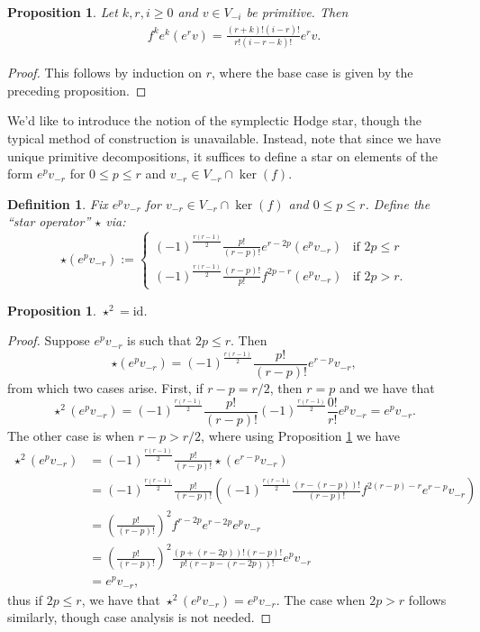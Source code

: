 \documentclass{amsart}
\newcommand{\id}{\text{id}}
\newtheorem{definition}[theorem]{Definition}
\newtheorem{prop}[theorem]{Proposition}
\theoremstyle{definition}
\begin{document}
\begin{prop}\label{e^kf^ke^rv_i}
    Let $k,r,i\geq 0$ and $v \in V_{-i}$ be primitive. Then
    \begin{align*}
        f^ke^k(e^rv) = \frac{(r+k)!(i-r)!}{r!(i-r-k)!} e^rv.
    \end{align*}
\end{prop}
\begin{proof}
    This follows by induction on $r$, where the base case is given by the preceding proposition.
\end{proof}
We'd like to introduce the notion of the symplectic Hodge star, though the typical method of construction is unavailable. Instead, note that since we have unique primitive decompositions, it suffices to define a star on elements of the form $e^pv_{-r}$ for $0 \leq p \leq r$ and $v_{-r}\in V_{-r}\cap \ker(f)$.
\begin{definition}
    Fix $e^pv_{-r}$ for $v_{-r} \in V_{-r}\cap \ker(f)$ and $0 \leq p \leq r$. Define the ``star operator'' $\star$ via:
    \begin{equation*}
        \star (e^pv_{-r}) := \begin{cases}
            (-1)^{\frac{r(r-1)}{2}} \frac{p!}{(r-p)!}e^{r-2p} (e^pv_{-r}) &\text{if }2p\leq r \\
            (-1)^{\frac{r(r-1)}{2}}\frac{(r-p)!}{p!} f^{2p-r}(e^pv_{-r}) &\text{if }2p>r.
        \end{cases}
    \end{equation*}
\end{definition}
\begin{prop}
    $\star^2=\id$.
\end{prop}
\begin{proof}
    Suppose $e^pv_{-r}$ is such that $2p \leq r$. Then
    \begin{equation*}
        \star(e^pv_{-r}) = (-1)^{\frac{r(r-1)}{2}} \frac{p!}{(r-p)!}e^{r-p}v_{-r},
    \end{equation*}
    from which two cases arise. First, if $r-p=r/2$, then $r=p$ and we have that
    \begin{equation*}
        \star^2(e^pv_{-r})=(-1)^{\frac{r(r-1)}{2}} \frac{p!}{(r-p)!} (-1)^{\frac{r(r-1)}{2}} \frac{0!}{r!}e^pv_{-r} = e^pv_{-r}.
    \end{equation*}
    The other case is when $r-p>r/2$, where using Proposition \ref{e^kf^ke^rv_i} we have
    \begin{align*}
        \star^2(e^pv_{-r}) &= (-1)^{\frac{r(r-1)}{2}} \frac{p!}{(r-p)!}\star (e^{r-p}v_{-r}) \\
        &= (-1)^{\frac{r(r-1)}{2}} \frac{p!}{(r-p)!}\left((-1)^{\frac{r(r-1)}{2}} \frac{(r-(r-p))!}{(r-p)!}f^{2(r-p)-r}e^{r-p}v_{-r} \right) \\
        &=\left(\frac{p!}{(r-p)!} \right)^2 f^{r-2p}e^{r-2p}e^pv_{-r} \\
        &=\left(\frac{p!}{(r-p)!} \right)^2 \frac{(p+(r-2p))! (r-p)!}{p! (r-p-(r-2p))!}e^pv_{-r} \\
        &= e^pv_{-r},
    \end{align*}
    thus if $2p\leq r$, we have that $\star^2(e^pv_{-r})=e^pv_{-r}$. The case when $2p>r$ follows similarly, though case analysis is not needed.
\end{proof}
\end{document}
